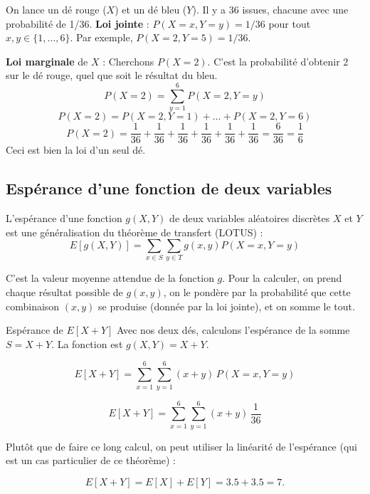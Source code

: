 \begin{examplebox}
On lance un dé rouge ($X$) et un dé bleu ($Y$). Il y a 36 issues, chacune avec une probabilité de 1/36.
\textbf{Loi jointe} : $P(X=x, Y=y) = 1/36$ pour tout $x, y \in \{1, \dots, 6\}$.
Par exemple, $P(X=2, Y=5) = 1/36$.

\textbf{Loi marginale} de $X$ : Cherchons $P(X=2)$. C'est la probabilité d'obtenir 2 sur le dé rouge, quel que soit le résultat du bleu.
$$ P(X=2) = \sum_{y=1}^6 P(X=2, Y=y) $$
$$ P(X=2) = P(X=2,Y=1) + \dots + P(X=2,Y=6) $$
$$ P(X=2) = \frac{1}{36} + \frac{1}{36} + \frac{1}{36} + \frac{1}{36} + \frac{1}{36} + \frac{1}{36} = \frac{6}{36} = \frac{1}{6} $$
Ceci est bien la loi d'un seul dé.
\end{examplebox}

\subsection{Espérance d'une fonction de deux variables}

\begin{definitionbox}
L'espérance d'une fonction $g(X,Y)$ de deux variables aléatoires discrètes $X$ et $Y$ est une généralisation du théorème de transfert (LOTUS) :
$$ E[g(X,Y)] = \sum_{x \in S} \sum_{y \in T} g(x,y) P(X=x, Y=y) $$
\end{definitionbox}

\begin{intuitionbox}
C'est la valeur moyenne attendue de la fonction $g$. Pour la calculer, on prend chaque résultat possible de $g(x,y)$, on le pondère par la probabilité que cette combinaison $(x,y)$ se produise (donnée par la loi jointe), et on somme le tout.
\end{intuitionbox}

\begin{examplebox}{Espérance de $E[X+Y]$}
Avec nos deux dés, calculons l'espérance de la somme $S = X + Y$.  
La fonction est $g(X,Y) = X + Y$.

\[
E[X+Y] = \sum_{x=1}^6 \sum_{y=1}^6 (x+y)\, P(X=x, Y=y)
\]

\[
E[X+Y] = \sum_{x=1}^6 \sum_{y=1}^6 (x+y)\, \frac{1}{36}
\]

Plutôt que de faire ce long calcul, on peut utiliser la linéarité de l'espérance (qui est un cas particulier de ce théorème) :

\[
E[X+Y] = E[X] + E[Y] = 3.5 + 3.5 = 7.
\]
\end{examplebox}

